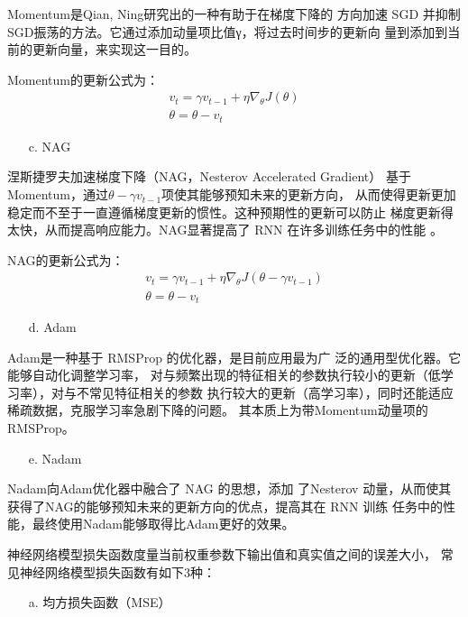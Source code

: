 \documentclass[AutoFakeBold]{LZUThesis}
\begin{document}
Momentum是Qian, Ning研究出的一种有助于在梯度下降的
方向加速 SGD 并抑制SGD振荡的方法。它通过添加动量项比值γ，将过去时间步的更新向
量到添加到当前的更新向量，来实现这一目的。

Momentum的更新公式为：
$$
\begin{matrix}
v_t = \gamma v_{t-1} + \eta \nabla_\theta J( \theta)\\
\theta = \theta - v_t
\end{matrix}
$$

\begin{itemize}
    \item[c. ] NAG
\end{itemize}

涅斯捷罗夫加速梯度下降（NAG，Nesterov Accelerated Gradient）
基于Momentum，通过$\theta - \gamma v_{t-1}$项使其能够预知未来的更新方向，
从而使得更新更加稳定而不至于一直遵循梯度更新的惯性。这种预期性的更新可以防止
梯度更新得太快，从而提高响应能力。NAG显著提高了 RNN 在许多训练任务中的性能
。

NAG的更新公式为：
$$
\begin{matrix}
v_t = \gamma v_{t-1} + \eta \nabla_\theta J( \theta - \gamma v_{t-1} )\\ 
\theta = \theta - v_t 
\end{matrix}
$$

\begin{itemize}
    \item[d. ] Adam
\end{itemize}

Adam是一种基于 RMSProp 的优化器，是目前应用最为广
泛的通用型优化器。它能够自动化调整学习率，
对与频繁出现的特征相关的参数执行较小的更新（低学习率），对与不常见特征相关的参数
执行较大的更新（高学习率），同时还能适应稀疏数据，克服学习率急剧下降的问题。
其本质上为带Momentum动量项的RMSProp。

\begin{itemize}
    \item[e. ] Nadam
\end{itemize}

Nadam向Adam优化器中融合了 NAG 的思想，添加
了Nesterov 动量，从而使其获得了NAG的能够预知未来的更新方向的优点，提高其在 RNN 训练
任务中的性能，最终使用Nadam能够取得比Adam更好的效果。

神经网络模型损失函数度量当前权重参数下输出值和真实值之间的误差大小，
常见神经网络模型损失函数有如下3种：
\begin{itemize}
    \item[a. ] 均方损失函数（MSE）
\end{itemize}
\end{document}
